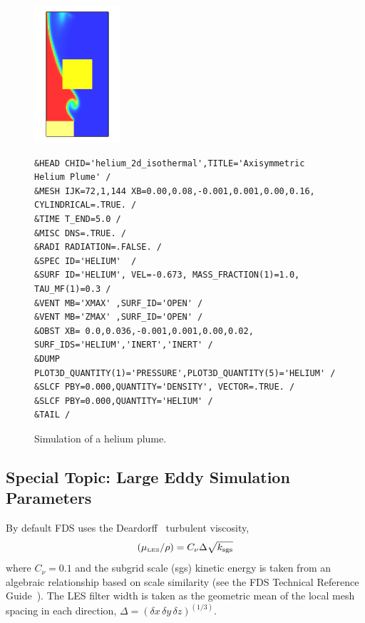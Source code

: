 \documentclass[11pt]{book}
\begin{document}
\begin{figure}[ht]
\noindent
\begin{minipage}{1.1in}
\includegraphics[height=2in]{SCRIPT_FIGURES/helium_2d_isothermal}
\end{minipage}
\hfill
\begin{minipage}{5.5in}
\begin{lstlisting}[basicstyle=\scriptsize\ttfamily]
&HEAD CHID='helium_2d_isothermal',TITLE='Axisymmetric Helium Plume' /
&MESH IJK=72,1,144 XB=0.00,0.08,-0.001,0.001,0.00,0.16, CYLINDRICAL=.TRUE. /
&TIME T_END=5.0 /
&MISC DNS=.TRUE. /
&RADI RADIATION=.FALSE. /
&SPEC ID='HELIUM'  /
&SURF ID='HELIUM', VEL=-0.673, MASS_FRACTION(1)=1.0, TAU_MF(1)=0.3 /
&VENT MB='XMAX' ,SURF_ID='OPEN' /
&VENT MB='ZMAX' ,SURF_ID='OPEN' /
&OBST XB= 0.0,0.036,-0.001,0.001,0.00,0.02, SURF_IDS='HELIUM','INERT','INERT' /
&DUMP PLOT3D_QUANTITY(1)='PRESSURE',PLOT3D_QUANTITY(5)='HELIUM' /
&SLCF PBY=0.000,QUANTITY='DENSITY', VECTOR=.TRUE. /
&SLCF PBY=0.000,QUANTITY='HELIUM' /
&TAIL /
\end{lstlisting}
\end{minipage}
\caption[Snapshot of the {\ct helium\_2d\_isothermal} test case]{Simulation of a helium plume.}
\label{helium_plume}
\end{figure}

\subsection{Special Topic: Large Eddy Simulation Parameters}
\label{info:LES}

By default FDS uses the Deardorff~\cite{Deardorff:1980,Pope:2000} turbulent viscosity,
\begin{equation}
(\mu_{\hbox{\tiny LES}}/\rho) = C_\nu \Delta \sqrt{k_{\rm sgs}}
\end{equation}
where $C_\nu=0.1$ and the subgrid scale (sgs) kinetic energy is taken from an algebraic relationship based on scale similarity (see the FDS Technical Reference Guide~\cite{FDS_Math_Guide}). The LES filter width is taken as the geometric mean of the local mesh spacing in each direction, $\Delta = (\delta x\, \delta y\, \delta z)^{(1/3)}$.
\end{document}
